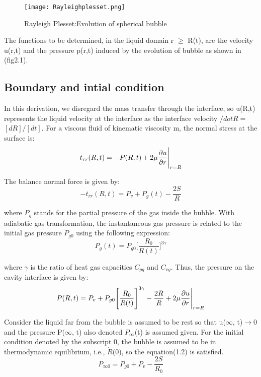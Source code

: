\begin{figure}[H]
 \centering
 \texttt{[image: Rayleighplesset.png]}
 \caption{Rayleigh Plesset:Evolution of spherical bubble}
  \label{fig:fig13}
\end{figure}

The functions to be determined, in the liquid domain r $\ge$ R(t), are
the velocity u(r,t) and the pressure p(r,t) induced by the evolution
of bubble as shown in (fig2.1).
\subsection{Boundary and intial condition}
In this derivation, we disregard the mass transfer through the
interface, so u(R,t) represents the liquid velocity at the interface
as the interface velocity $/dot R=$$[dR]/[dt]$.  For a viscous fluid
of kinematic viscosity m, the normal stress at the surface is:
\begin{equation}
{t_{rr}}(R,t)=-P(R,t)+2{\mu}{\frac{\partial{u}}{\partial{r}}}\Bigg{\vert}_{r=R}
\end{equation}

The balance normal force is given by:
\begin{equation}
-{t_{rr}}(R,t)=P_{v}+{P_{g}}(t)-{\frac{2S}{R}}
\end{equation}

where $P_g$ stands for the partial pressure of the gas inside the
bubble. With adiabatic gas transformation, the instantaneous gas
pressure is related to the initial gas pressure $P_{g0}$ using the
following expression:
\begin{equation}
{P_{g}}(t)=P_{g0}\Bigg[\frac{R_0}{R(t)}\Bigg]^{3\gamma}
\end{equation}

where $\gamma$ is the ratio of heat gas capacities $C_{pg}$ and
$C_{vg}$.  Thus, the pressure on the cavity interface is given by:
\begin{equation}
P(R,t)=P_{v}+P_{g0}\Bigg[{\frac{R_0}{R(t)}}\Bigg]^{3\gamma}-{\frac{2R}{R}}+2\mu{\frac{\partial{u}}{\partial{r}}}\Bigg{\vert}_{r=R}
\end{equation}

Consider the liquid far from the bubble is assumed to be rest so that
u($\infty$, t)$\rightarrow$0 and the pressure P($\infty$, t) also
denoted $P_{\infty}$(t) is assumed given.  For the initial condition
denoted by the subscript 0, the bubble is assumed to be in
thermodynamic equilibrium, i.e., $\dot{R}$(0), so the equation(1.2) is
satisfied.
\begin{equation}
P_{{\infty}{0}} =P_{g0}+P_v-\frac{2S}{R_0}
\end{equation}

